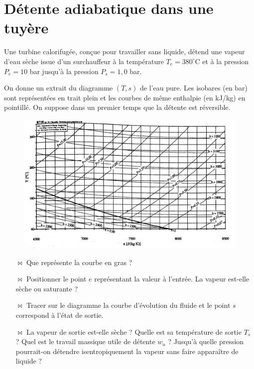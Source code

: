 \documentclass{report}
\begin{document}
\section*{Détente adiabatique dans une tuyère}

Une turbine calorifugée, conçue pour travailler sans liquide, détend une vapeur d'eau sèche issue d'un surchauffeur à la température $T_e=380^\circ$C et à la pression $P_e=10$ bar jusqu'à la pression $P_s=1,0$ bar. 

On donne un extrait du diagramme $(T,s)$ de l'eau pure. Les isobares (en bar) sont représentées en trait plein et les courbes de même enthalpie (en kJ/kg) en pointillé. On suppose dans un premier temps que la détente est réversible.

\begin{figure}[!h]
\centering
\includegraphics[width=0.8\linewidth]{diagramme_TS.png}
\end{figure}

\begin{itemize}

	\item[$\bowtie$] Que représente la courbe en gras ?
	
	\item[$\bowtie$] Positionner le point $e$ représentant la valeur à l'entrée. La vapeur est-elle sèche ou saturante ?
	
		\item[$\bowtie$]  Tracer sur le diagramme la courbe d'évolution du fluide et le point $s$ correspond à l'état de sortie.
		
		\item[$\bowtie$] La vapeur de sortie est-elle sèche ? Quelle est sa température de sortie $T_s$ ? Quel est le travail massique utile de détente $w_u$ ? Jusqu'à quelle pression pourrait-on détendre isentropiquement la vapeur sans faire apparaître de liquide ?
		
\end{itemize}
\end{document}
